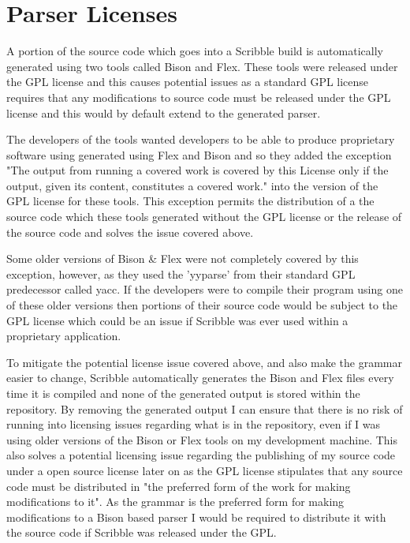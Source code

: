 \documentclass[]{final_report}
\begin{document}
\section{Parser Licenses}

A portion of the source code which goes into a Scribble build is automatically generated using two tools called Bison and Flex. These tools were released under the GPL license and this causes potential issues as a standard GPL license requires that any modifications to source code must be released under the GPL license and this would by default extend to the generated parser.

The developers of the tools wanted developers to be able to produce proprietary software using generated using Flex and Bison and so they added the exception "The output from running a covered work is covered by this License only if the output, given its content, constitutes a covered work." into the version of the GPL license for these tools. This exception permits the distribution of a the source code which these tools generated without the GPL license or the release of the source code and solves the issue covered above\cite{BISONGPL}.

Some older versions of Bison \& Flex were not completely covered by this exception, however, as they used the 'yyparse' from their standard GPL predecessor called yacc. If the developers were to compile their program using one of these older versions then portions of their source code would be subject to the GPL license which could be an issue if Scribble was ever used within a proprietary application.

To mitigate the potential license issue covered above, and also make the grammar easier to change, Scribble automatically generates the Bison and Flex files every time it is compiled and none of the generated output is stored within the repository. By removing the generated output I can ensure that there is no risk of running into licensing issues regarding what is in the repository, even if I was using older versions of the Bison or Flex tools on my development machine. This also solves a potential licensing issue regarding the publishing of my source code under a open source license later on as the GPL license stipulates that any source code must be distributed in "the preferred form of the work for making modifications to it". As the grammar is the preferred form for making modifications to a Bison based parser I would be required to distribute it with the source code if Scribble was released under the GPL.
\end{document}
